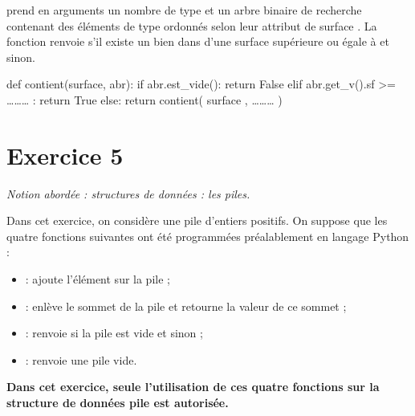 \documentclass[11pt,a4paper,french,twoside]{PMCours}
\begin{document}
\begin{enumerate}
\begin{enumerate}
prend en arguments un nombre  de type  et un arbre binaire de recherche
 contenant des éléments de type  ordonnés selon leur attribut de surface . La
fonction  renvoie  s'il existe un bien dans  d'une
surface supérieure ou égale à  et  sinon.
\begin{Python*}
def contient(surface, abr):
    if abr.est_vide():
        return False
    elif abr.get_v().sf >= ……… :
        return True 
    else:
        return contient( surface , ……… ) 
\end{Python*}
\end{enumerate}
\end{enumerate}

\newpage
\section*{Exercice 5}
\emph{Notion abordée : structures de données : les piles.}

\medskip
Dans cet exercice, on considère une pile d'entiers positifs. On suppose que les quatre
fonctions suivantes ont été programmées préalablement en langage Python :
\begin{itemize}
\item[]  : ajoute l'élément  sur la pile  ;
\item[]  : enlève le sommet de la pile  et retourne la valeur de ce sommet ;
\item[]  : renvoie  si la pile est vide et  sinon ;
\item[]  : renvoie une pile vide.
\end{itemize} 

\textbf{Dans cet exercice, seule l'utilisation de ces quatre fonctions sur la structure de
données pile est autorisée.}
\end{document}
